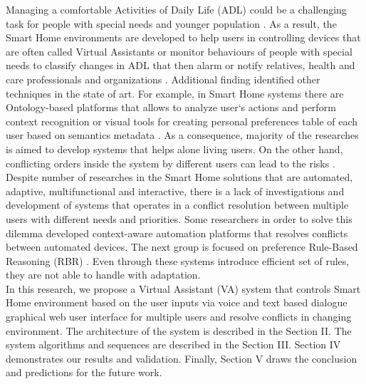 \documentclass{llncs}
\begin{document}
    Managing a comfortable Activities of Daily Life (ADL) could be a challenging task for people with special needs
    and younger population \cite{9}.
    As a result,
    the Smart Home environments are developed to help users in controlling devices \cite{13}
    that are often called Virtual Assistants \cite{9} or monitor behaviours of people
    with special needs \cite{3} to classify changes in ADL that then alarm or notify relatives, health and care professionals
    and organizations \cite{15}.
    Additional finding identified other techniques in the state of art.
    For example, in Smart Home systems there are Ontology-based platforms that allows to analyze user`s actions and
    perform context recognition \cite{1} or visual tools for creating personal preferences table of each user based on semantics
    metadata \cite{8}.
    As a consequence, majority of the researches is aimed to develop systems that helps alone living users.
    On the other hand, conflicting orders inside the system by different users can lead to the risks \cite{5}.
    Despite number of
    researches in the Smart Home solutions that are automated, adaptive, multifunctional and interactive, there is a lack of
    investigations and development of systems that operates in a conflict resolution between multiple users with different
    needs and priorities.
    Some researchers in order to solve this dilemma developed context-aware automation platforms
    \cite{5,6} that resolves conflicts between automated devices.
    The next group is focused on preference Rule-Based Reasoning (RBR) \cite{9}.
    Even through
    these systems introduce efficient set of rules, they are not able to handle with adaptation. \\
    In this research, we propose a Virtual Assistant (VA) system that controls Smart Home environment based on the user inputs via
    voice and text based dialogue graphical web user interface for multiple users and resolve conflicts in changing environment.
    The architecture of the system is
    described in the Section II. The system algorithms and sequences are described in the Section III. Section IV demonstrates
    our results and validation.
    Finally, Section V draws the conclusion and predictions for the future work.
\end{document}
